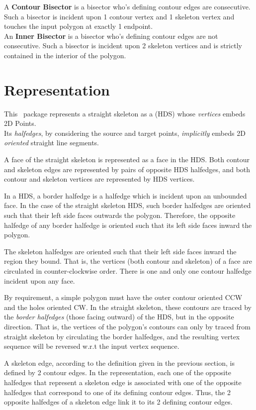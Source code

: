 A \textbf{Contour Bisector} is a bisector who's defining contour edges are consecutive. Such a bisector is incident upon 1 contour vertex and 1 skeleton vertex and touches the input polygon at exactly 1 endpoint.\\
An \textbf{Inner Bisector} is a bisector who's defining contour edges are not consecutive. Such a bisector is incident upon 2 skeleton vertices and is strictly contained in the interior of the polygon.



\section{Representation}

This \cgal\ package represents a straight skeleton as a  (HDS) whose \textit{vertices} embeds 2D Points.\\
Its \textit{halfedges}, by considering the source and target points, \textit{implicitly} embeds 2D \textit{oriented} straight line segments. 

A face of the straight skeleton is represented as a face in the HDS. Both contour and skeleton edges are represented by pairs of opposite HDS halfedges, and both contour and skeleton vertices are represented by HDS vertices.

In a HDS, a border halfedge is a halfedge which is incident upon an unbounded face. In the case of the straight skeleton HDS, such border halfedges are oriented such that their left side faces outwards the polygon. Therefore, the opposite halfedge of any border halfedge is oriented such that its left side faces inward the polygon.

The skeleton halfedges are oriented such that their left side faces inward the region they bound. That is, the vertices (both contour and skeleton) of a face are circulated in counter-clockwise order. There is one and only one contour halfedge incident upon any face. 

By requirement, a simple polygon must have the outer contour oriented CCW and the holes oriented CW. In the straight skeleton, these contours are traced by the \textit{border halfedges} (those facing outward) of the HDS, but in the opposite direction. That is, the vertices of the polygon's contours can only by traced from straight skeleton by circulating the border halfedges, and the resulting vertex sequence will be reversed w.r.t the input vertex sequence.

A skeleton edge, according to the definition given in the previous section, is defined by 2 contour edges. In the representation, each one of the opposite halfedges that represent a skeleton edge is associated with one of the opposite halfedges that correspond to one of its defining contour edges. Thus, the 2 opposite halfedges of a skeleton edge link it to its 2 defining contour edges.

